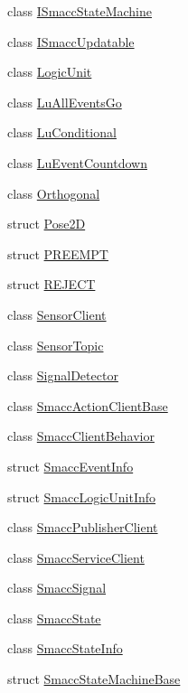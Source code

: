 \begin{DoxyCompactItemize}
\item 
class \hyperlink{classsmacc_1_1ISmaccStateMachine}{I\+Smacc\+State\+Machine}
\item 
class \hyperlink{classsmacc_1_1ISmaccUpdatable}{I\+Smacc\+Updatable}
\item 
class \hyperlink{classsmacc_1_1LogicUnit}{Logic\+Unit}
\item 
class \hyperlink{classsmacc_1_1LuAllEventsGo}{Lu\+All\+Events\+Go}
\item 
class \hyperlink{classsmacc_1_1LuConditional}{Lu\+Conditional}
\item 
class \hyperlink{classsmacc_1_1LuEventCountdown}{Lu\+Event\+Countdown}
\item 
class \hyperlink{classsmacc_1_1Orthogonal}{Orthogonal}
\item 
struct \hyperlink{structsmacc_1_1Pose2D}{Pose2D}
\item 
struct \hyperlink{structsmacc_1_1PREEMPT}{P\+R\+E\+E\+M\+PT}
\item 
struct \hyperlink{structsmacc_1_1REJECT}{R\+E\+J\+E\+CT}
\item 
class \hyperlink{classsmacc_1_1SensorClient}{Sensor\+Client}
\item 
class \hyperlink{classsmacc_1_1SensorTopic}{Sensor\+Topic}
\item 
class \hyperlink{classsmacc_1_1SignalDetector}{Signal\+Detector}
\item 
class \hyperlink{classsmacc_1_1SmaccActionClientBase}{Smacc\+Action\+Client\+Base}
\item 
class \hyperlink{classsmacc_1_1SmaccClientBehavior}{Smacc\+Client\+Behavior}
\item 
struct \hyperlink{structsmacc_1_1SmaccEventInfo}{Smacc\+Event\+Info}
\item 
struct \hyperlink{structsmacc_1_1SmaccLogicUnitInfo}{Smacc\+Logic\+Unit\+Info}
\item 
class \hyperlink{classsmacc_1_1SmaccPublisherClient}{Smacc\+Publisher\+Client}
\item 
class \hyperlink{classsmacc_1_1SmaccServiceClient}{Smacc\+Service\+Client}
\item 
class \hyperlink{classsmacc_1_1SmaccSignal}{Smacc\+Signal}
\item 
class \hyperlink{classsmacc_1_1SmaccState}{Smacc\+State}
\item 
class \hyperlink{classsmacc_1_1SmaccStateInfo}{Smacc\+State\+Info}
\item 
struct \hyperlink{structsmacc_1_1SmaccStateMachineBase}{Smacc\+State\+Machine\+Base}

\end{DoxyCompactItemize}
